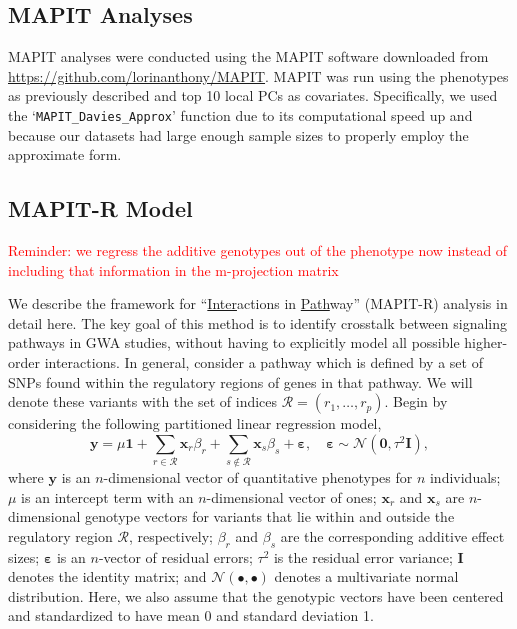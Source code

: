 \documentclass[12pt,a4paper]{article}
\newcommand{\bx}{\mathbf{x}}
\newcommand{\by}{\mathbf{y}}
\newcommand{\bI}{\mathbf{I}}
\newcommand{\bvarepsilon}{\boldsymbol\varepsilon}
\begin{document}
\subsection{MAPIT Analyses}

MAPIT analyses were conducted using the MAPIT software downloaded from \url{https://github.com/lorinanthony/MAPIT}. MAPIT was run using the phenotypes as previously described and top 10 local PCs as covariates. Specifically, we used the `\texttt{MAPIT\_Davies\_Approx}' function due to its computational speed up and because our datasets had large enough sample sizes to properly employ the approximate form.  






\subsection{MAPIT-R Model}

\textcolor{red}{Reminder: we regress the additive genotypes out of the phenotype now instead of including that information in the m-projection matrix}

We describe the framework for ``\underline{Inter}actions in \underline{Path}way'' (MAPIT-R) analysis in detail here. The key goal of this method is to identify crosstalk between signaling pathways in GWA studies, without having to explicitly model all possible higher-order interactions. In general, consider a pathway which is defined by a set of SNPs found within the regulatory regions of genes in that pathway. We will denote these variants with the set of indices $\mathcal{R} = (r_1,\ldots,r_p)$. Begin by considering the following partitioned linear regression model,
\begin{equation}\label{LM}
\by = \mu\bm{1}+\sum_{r\in \mathcal{R}}\bx_r\beta_{r}+\sum_{s\not\in \mathcal{R}}\bx_s\beta_{s}+\bvarepsilon, \quad \bvarepsilon\sim \mathcal{N}(\mathbf{0}, \tau^2\bI),
\end{equation}
where $\by$ is an $n$-dimensional vector of quantitative phenotypes for $n$ individuals; $\mu$ is an intercept term with an $n$-dimensional vector of ones; $\bx_r$ and $\bx_s$ are $n$-dimensional genotype vectors for variants that lie within and outside the regulatory region $\mathcal{R}$, respectively; $\beta_r$ and $\beta_s$ are the corresponding additive effect sizes; $\bvarepsilon$ is an $n$-vector of residual errors; $\tau^2$ is the residual error variance; $\bI$ denotes the identity matrix; and $\mathcal{N}(\bullet,\bullet)$ denotes a multivariate normal distribution. Here, we also assume that the genotypic vectors have been centered and standardized to have mean 0 and standard deviation 1.
\end{document}
